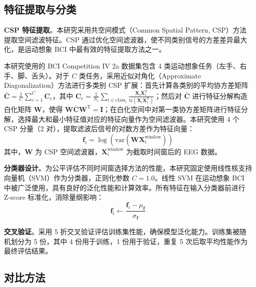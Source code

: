 \subsection{特征提取与分类}
\label{subsec:feature_classification}

\textbf{CSP 特征提取}。本研究采用共空间模式（Common Spatial Pattern, CSP）方法提取空间滤波特征\cite{blankertz2008optimizing, mcfarland1997spatial}。CSP 通过优化空间滤波器，使不同类别信号的方差差异最大化，是运动想象 BCI 中最有效的特征提取方法之一。

本研究使用的 BCI Competition IV 2a 数据集包含 4 类运动想象任务（左手、右手、脚、舌头）。对于 $C$ 类任务，采用近似对角化（Approximate Diagonalization）方法进行多类别 CSP 扩展\cite{blankertz2008optimizing}：首先计算各类别的平均协方差矩阵 $\bar{\mathbf{C}} = \frac{1}{C}\sum_{c=1}^{C} \mathbf{C}_c$，其中 $\mathbf{C}_c = \frac{1}{N_c}\sum_{i \in \text{class}_c} \frac{\mathbf{X}_i \mathbf{X}_i^{\text{T}}}{\text{tr}(\mathbf{X}_i \mathbf{X}_i^{\text{T}})}$；然后对 $\bar{\mathbf{C}}$ 进行特征分解构造白化矩阵 $\mathbf{W}$，使得 $\mathbf{W} \bar{\mathbf{C}} \mathbf{W}^{\text{T}} = \mathbf{I}$；在白化空间中对第一类协方差矩阵进行特征分解，选择最大和最小特征值对应的特征向量作为空间滤波器。本研究使用 4 个 CSP 分量（2 对），提取滤波后信号的对数方差作为特征向量：
\begin{equation}
\mathbf{f}_i = \log \left( \text{var}(\mathbf{W} \mathbf{X}_i^{\text{window}}) \right)
\end{equation}
其中，$\mathbf{W}$ 为 CSP 空间滤波器，$\mathbf{X}_i^{\text{window}}$ 为截取时间窗后的 EEG 数据。

\textbf{分类器设计}。为公平评估不同时间窗选择方法的性能，本研究固定使用线性核支持向量机（SVM）作为分类器，正则化参数 $C = 1.0$\cite{lotte2007review, pedregosa2011scikit}。线性 SVM 在运动想象 BCI 中被广泛使用，具有良好的泛化性能和计算效率。所有特征在输入分类器前进行 Z-score 标准化，消除量纲影响：
\begin{equation}
\mathbf{f}_i \leftarrow \frac{\mathbf{f}_i - \mu_{\mathbf{f}}}{\sigma_{\mathbf{f}}}
\end{equation}

\textbf{交叉验证}。采用 5 折交叉验证评估训练集性能，确保模型泛化能力\cite{lotte2007review}。训练集被随机划分为 5 份，其中 4 份用于训练，1 份用于验证，重复 5 次后取平均性能作为最终评估结果。

\subsection{对比方法}
\label{subsec:baseline_methods}

